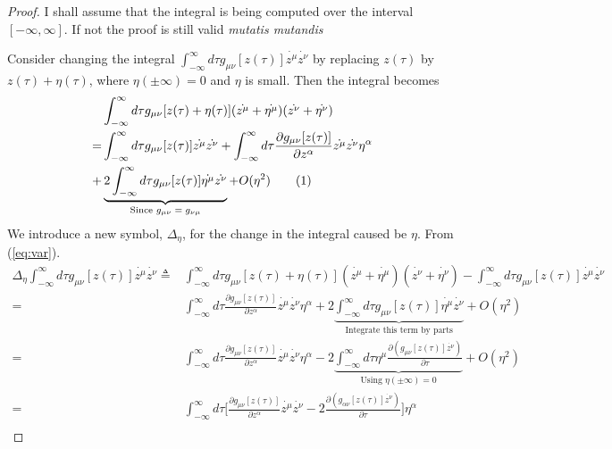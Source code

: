 \documentclass[]{article}
\newcommand\numberthis{\addtocounter{equation}{1}\tag{\theequation}}
\begin{document}
\begin{proof}
	I shall assume that the integral is being computed over the interval $[-\infty,\infty]$. If not the proof is still valid \emph{mutatis mutandis}
	
	Consider changing the integral $\int_{-\infty}^{\infty} d \tau g_{\mu\nu}[z(\tau)] \dot{z^{\mu}} \dot{z^{\nu}}$ by replacing $z(\tau)$ by $z(\tau)+\eta(\tau)$, where $\eta(\pm\infty)=0$ and  $\eta$ is small. Then the integral becomes
	\begin{align*}
	&\int_{-\infty}^{\infty} d \tau  g_{\mu\nu}[z(\tau)+\eta(\tau)] ( \dot{z^{\mu}}+ \dot{\eta^{\mu}}) ( \dot{z^{\nu}}+ \dot{\eta^{\nu}})\\
	=&\int_{-\infty}^{\infty} d \tau g_{\mu\nu}[z(\tau)] \dot{z^{\mu}} \dot{z^{\nu}} + \int_{-\infty}^{\infty} d \tau \frac{\partial g_{\mu\nu}[z(\tau)]}{\partial z^{\alpha}} \dot{z^{\mu}} \dot{z^{\nu}} \eta^{\alpha}\\
	+&\underbrace{2\int_{-\infty}^{\infty} d \tau   g_{\mu\nu}[z(\tau)] \dot{\eta^{\mu}} \dot{z^{\nu}}}_\text{Since $g_{\mu\nu}=g_{\nu\mu}$}  + O(\eta^2) \numberthis \label{eq:var}
	\end{align*}
	We introduce a new symbol, $\Delta_{\eta}$, for the change in the integral caused be $\eta$. From (\ref{eq:var}).
	\begin{align*}
	\Delta_{\eta} \int_{-\infty}^{\infty} d \tau g_{\mu\nu}[z(\tau)] \dot{z^{\mu}} \dot{z^{\nu}} \triangleq& \int_{-\infty}^{\infty} d \tau  g_{\mu\nu}[z(\tau)+\eta(\tau)] ( \dot{z^{\mu}}+ \dot{\eta^{\mu}}) ( \dot{z^{\nu}}+ \dot{\eta^{\nu}}) -\int_{-\infty}^{\infty} d \tau g_{\mu\nu}[z(\tau)] \dot{z^{\mu}} \dot{z^{\nu}}\\
	=&\int_{-\infty}^{\infty} d \tau \frac{\partial g_{\mu\nu}[z(\tau)]}{\partial z^{\alpha}} \dot{z^{\mu}} \dot{z^{\nu}} \eta^{\alpha}+2\underbrace{\int_{-\infty}^{\infty} d \tau   g_{\mu\nu}[z(\tau)] \dot{\eta^{\mu}} \dot{z^{\nu}}}_\text{Integrate this term by parts} + O(\eta^2) \\
	=&\int_{-\infty}^{\infty} d \tau \frac{\partial g_{\mu\nu}[z(\tau)]}{\partial z^{\alpha}} \dot{z^{\mu}} \dot{z^{\nu}} \eta^{\alpha}-2\underbrace{\int_{-\infty}^{\infty} d \tau  \eta^{\mu} \frac{ \partial (g_{\mu\nu}[z(\tau)] \dot{z^{\nu}})}{\partial \tau}}_\text{Using $\eta(\pm\infty)=0$} + O(\eta^2)\\
	=&\int_{-\infty}^{\infty} d \tau \big[\frac{\partial g_{\mu\nu}[z(\tau)]}{\partial z^{\alpha}} \dot{z^{\mu}} \dot{z^{\nu}}-2\frac{ \partial (g_{\alpha\nu}[z(\tau)] \dot{z^{\nu}})}{\partial \tau} \big]\eta^{\alpha} \\

\end{align*}
\end{proof}
\end{document}
